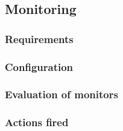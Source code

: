 

\subsection{Monitoring}

\subsubsection{Requirements}

\subsubsection{Configuration}

\subsubsection{Evaluation of monitors}

\subsubsection{Actions fired}
